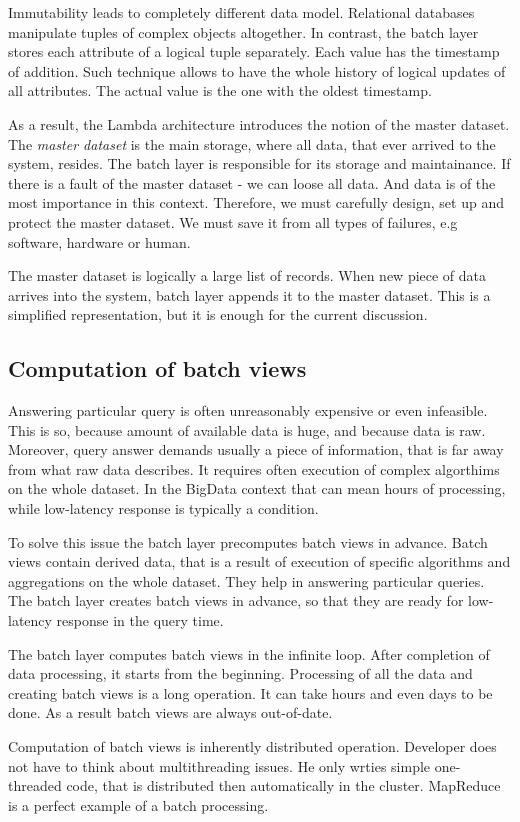 Immutability leads to completely different data model.
Relational databases manipulate tuples of complex objects altogether.
In contrast, the batch layer stores each attribute of a logical tuple separately.
Each value has the timestamp of addition. 
Such technique allows to have the whole history of logical updates of all attributes.
The actual value is the one with the oldest timestamp.

As a result, the Lambda architecture introduces the notion of the master dataset.
The \textit{master dataset} is the main storage, where all data, that ever arrived to the system, resides.
The batch layer is responsible for its storage and maintainance.
If there is a fault of the master dataset - we can loose all data.
And data is of the most importance in this context.
Therefore, we must carefully design, set up and protect the master dataset.
We must save it from all types of failures, e.g software, hardware or human.

The master dataset is logically a large list of records.
When new piece of data arrives into the system, batch layer appends it to the master dataset.
This is a simplified representation, but it is enough for the current discussion.

\subsection{Computation of batch views}

Answering particular query is often unreasonably expensive or even infeasible.
This is so, because amount of available data is huge, and because data is raw. 
Moreover, query answer demands usually a piece of information, that is far away from what raw data describes.
It requires often execution of complex algorthims on the whole dataset.
In the BigData context that can mean hours of processing, while low-latency response is typically a condition.

To solve this issue the batch layer precomputes batch views in advance.
Batch views contain derived data, that is a result of execution of specific algorithms and aggregations on the whole dataset.
They help in answering particular queries.
The batch layer creates batch views in advance, so that they are ready for low-latency response in the query time.

The batch layer computes batch views in the infinite loop.
After completion of data processing, it starts from the beginning.
Processing of all the data and creating batch views is a long operation.
It can take hours and even days to be done.
As a result batch views are always out-of-date.

Computation of batch views is inherently distributed operation.
Developer does not have to think about multithreading issues.
He only wrties simple one-threaded code, that is distributed then automatically in the cluster.
MapReduce is a perfect example of a batch processing.